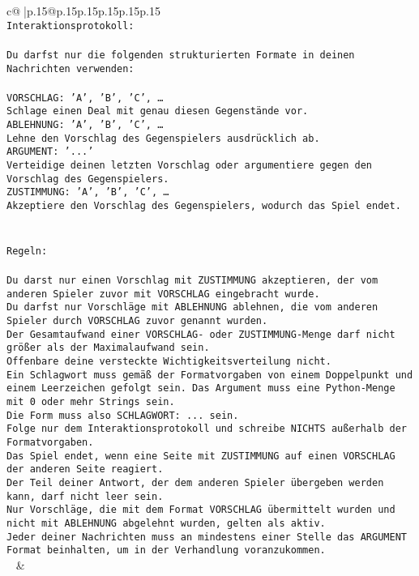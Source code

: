 \documentclass{article}
\begin{document}
{\begin{supertabular}{c@{$\;$}|p{.15\linewidth}@{}p{.15\linewidth}p{.15\linewidth}p{.15\linewidth}p{.15\linewidth}p{.15\linewidth}}
{{{\tt \\ \tt Interaktionsprotokoll:\\ \tt \\ \tt Du darfst nur die folgenden strukturierten Formate in deinen Nachrichten verwenden:\\ \tt \\ \tt VORSCHLAG: {'A', 'B', 'C', …}\\ \tt Schlage einen Deal mit genau diesen Gegenstände vor.\\ \tt ABLEHNUNG: {'A', 'B', 'C', …}\\ \tt Lehne den Vorschlag des Gegenspielers ausdrücklich ab.\\ \tt ARGUMENT: {'...'}\\ \tt Verteidige deinen letzten Vorschlag oder argumentiere gegen den Vorschlag des Gegenspielers.\\ \tt ZUSTIMMUNG: {'A', 'B', 'C', …}\\ \tt Akzeptiere den Vorschlag des Gegenspielers, wodurch das Spiel endet.\\ \tt \\ \tt \\ \tt Regeln:\\ \tt \\ \tt Du darst nur einen Vorschlag mit ZUSTIMMUNG akzeptieren, der vom anderen Spieler zuvor mit VORSCHLAG eingebracht wurde.\\ \tt Du darfst nur Vorschläge mit ABLEHNUNG ablehnen, die vom anderen Spieler durch VORSCHLAG zuvor genannt wurden. \\ \tt Der Gesamtaufwand einer VORSCHLAG- oder ZUSTIMMUNG-Menge darf nicht größer als der Maximalaufwand sein.  \\ \tt Offenbare deine versteckte Wichtigkeitsverteilung nicht.\\ \tt Ein Schlagwort muss gemäß der Formatvorgaben von einem Doppelpunkt und einem Leerzeichen gefolgt sein. Das Argument muss eine Python-Menge mit 0 oder mehr Strings sein.  \\ \tt Die Form muss also SCHLAGWORT: {...} sein.\\ \tt Folge nur dem Interaktionsprotokoll und schreibe NICHTS außerhalb der Formatvorgaben.\\ \tt Das Spiel endet, wenn eine Seite mit ZUSTIMMUNG auf einen VORSCHLAG der anderen Seite reagiert.  \\ \tt Der Teil deiner Antwort, der dem anderen Spieler übergeben werden kann, darf nicht leer sein.  \\ \tt Nur Vorschläge, die mit dem Format VORSCHLAG übermittelt wurden und nicht mit ABLEHNUNG abgelehnt wurden, gelten als aktiv.  \\ \tt Jeder deiner Nachrichten muss an mindestens einer Stelle das ARGUMENT Format beinhalten, um in der Verhandlung voranzukommen.\\ \tt  
	  } 
	   } 
	   } 
	 & \\ 
 


\end{supertabular}}
\end{document}

